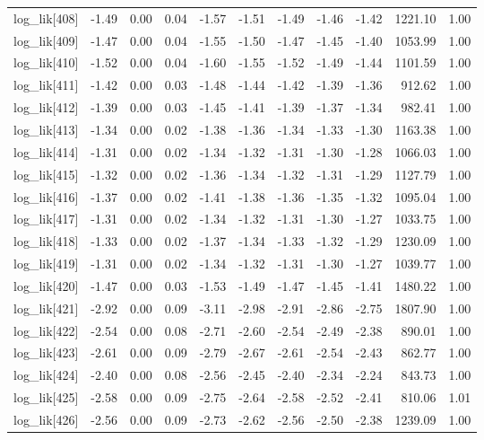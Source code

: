 \begin{table}[ht]
\begin{tabular}{rrrrrrrrrrr}
  log\_lik[408] & -1.49 & 0.00 & 0.04 & -1.57 & -1.51 & -1.49 & -1.46 & -1.42 & 1221.10 & 1.00 \\ 
  log\_lik[409] & -1.47 & 0.00 & 0.04 & -1.55 & -1.50 & -1.47 & -1.45 & -1.40 & 1053.99 & 1.00 \\ 
  log\_lik[410] & -1.52 & 0.00 & 0.04 & -1.60 & -1.55 & -1.52 & -1.49 & -1.44 & 1101.59 & 1.00 \\ 
  log\_lik[411] & -1.42 & 0.00 & 0.03 & -1.48 & -1.44 & -1.42 & -1.39 & -1.36 & 912.62 & 1.00 \\ 
  log\_lik[412] & -1.39 & 0.00 & 0.03 & -1.45 & -1.41 & -1.39 & -1.37 & -1.34 & 982.41 & 1.00 \\ 
  log\_lik[413] & -1.34 & 0.00 & 0.02 & -1.38 & -1.36 & -1.34 & -1.33 & -1.30 & 1163.38 & 1.00 \\ 
  log\_lik[414] & -1.31 & 0.00 & 0.02 & -1.34 & -1.32 & -1.31 & -1.30 & -1.28 & 1066.03 & 1.00 \\ 
  log\_lik[415] & -1.32 & 0.00 & 0.02 & -1.36 & -1.34 & -1.32 & -1.31 & -1.29 & 1127.79 & 1.00 \\ 
  log\_lik[416] & -1.37 & 0.00 & 0.02 & -1.41 & -1.38 & -1.36 & -1.35 & -1.32 & 1095.04 & 1.00 \\ 
  log\_lik[417] & -1.31 & 0.00 & 0.02 & -1.34 & -1.32 & -1.31 & -1.30 & -1.27 & 1033.75 & 1.00 \\ 
  log\_lik[418] & -1.33 & 0.00 & 0.02 & -1.37 & -1.34 & -1.33 & -1.32 & -1.29 & 1230.09 & 1.00 \\ 
  log\_lik[419] & -1.31 & 0.00 & 0.02 & -1.34 & -1.32 & -1.31 & -1.30 & -1.27 & 1039.77 & 1.00 \\ 
  log\_lik[420] & -1.47 & 0.00 & 0.03 & -1.53 & -1.49 & -1.47 & -1.45 & -1.41 & 1480.22 & 1.00 \\ 
  log\_lik[421] & -2.92 & 0.00 & 0.09 & -3.11 & -2.98 & -2.91 & -2.86 & -2.75 & 1807.90 & 1.00 \\ 
  log\_lik[422] & -2.54 & 0.00 & 0.08 & -2.71 & -2.60 & -2.54 & -2.49 & -2.38 & 890.01 & 1.00 \\ 
  log\_lik[423] & -2.61 & 0.00 & 0.09 & -2.79 & -2.67 & -2.61 & -2.54 & -2.43 & 862.77 & 1.00 \\ 
  log\_lik[424] & -2.40 & 0.00 & 0.08 & -2.56 & -2.45 & -2.40 & -2.34 & -2.24 & 843.73 & 1.00 \\ 
  log\_lik[425] & -2.58 & 0.00 & 0.09 & -2.75 & -2.64 & -2.58 & -2.52 & -2.41 & 810.06 & 1.01 \\ 
  log\_lik[426] & -2.56 & 0.00 & 0.09 & -2.73 & -2.62 & -2.56 & -2.50 & -2.38 & 1239.09 & 1.00 \\ 

\end{tabular}
\end{table}

